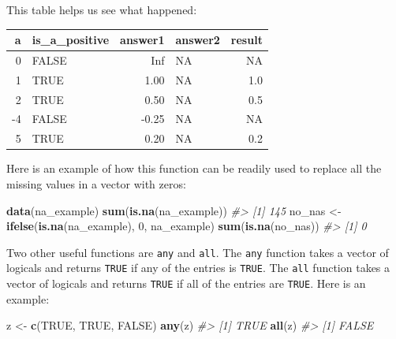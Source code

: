 \documentclass[
]{krantz}
\newenvironment{Shaded}{\begin{snugshade}}{\end{snugshade}}
\newcommand{\CommentTok}[1]{\textcolor[rgb]{0.37,0.37,0.37}{\textit{#1}}}
\newcommand{\DecValTok}[1]{\textcolor[rgb]{0.06,0.06,0.06}{#1}}
\newcommand{\KeywordTok}[1]{\textcolor[rgb]{0.27,0.27,0.27}{\textbf{#1}}}
\newcommand{\NormalTok}[1]{#1}
\newcommand{\OtherTok}[1]{\textcolor[rgb]{0.37,0.37,0.37}{#1}}
\newcommand{\StringTok}[1]{\textcolor[rgb]{0.5,0.5,0.5}{#1}}
\begin{document}
This table helps us see what happened:

\begin{table}[H]
\centering\begingroup\fontsize{8}{10}\selectfont

\begin{tabular}{rlrlr}
\toprule
a & is\_a\_positive & answer1 & answer2 & result\\
\midrule
0 & FALSE & Inf & NA & NA\\
1 & TRUE & 1.00 & NA & 1.0\\
2 & TRUE & 0.50 & NA & 0.5\\
-4 & FALSE & -0.25 & NA & NA\\
5 & TRUE & 0.20 & NA & 0.2\\
\bottomrule
\end{tabular}
\endgroup{}
\end{table}

Here is an example of how this function can be readily used to replace all the missing values in a vector with zeros:

\begin{Shaded}
\begin{Highlighting}[]
\KeywordTok{data}\NormalTok{(na_example)}
\KeywordTok{sum}\NormalTok{(}\KeywordTok{is.na}\NormalTok{(na_example))}
\CommentTok{#> [1] 145}
\NormalTok{no_nas <-}\StringTok{ }\KeywordTok{ifelse}\NormalTok{(}\KeywordTok{is.na}\NormalTok{(na_example), }\DecValTok{0}\NormalTok{, na_example) }
\KeywordTok{sum}\NormalTok{(}\KeywordTok{is.na}\NormalTok{(no_nas))}
\CommentTok{#> [1] 0}
\end{Highlighting}
\end{Shaded}

Two other useful functions are \texttt{any} and \texttt{all}. The \texttt{any} function takes a vector of logicals and returns \texttt{TRUE} if any of the entries is \texttt{TRUE}. The \texttt{all} function takes a vector of logicals and returns \texttt{TRUE} if all of the entries are \texttt{TRUE}. Here is an example:

\begin{Shaded}
\begin{Highlighting}[]
\NormalTok{z <-}\StringTok{ }\KeywordTok{c}\NormalTok{(}\OtherTok{TRUE}\NormalTok{, }\OtherTok{TRUE}\NormalTok{, }\OtherTok{FALSE}\NormalTok{)}
\KeywordTok{any}\NormalTok{(z)}
\CommentTok{#> [1] TRUE}
\KeywordTok{all}\NormalTok{(z)}
\CommentTok{#> [1] FALSE}
\end{Highlighting}
\end{Shaded}
\end{document}
